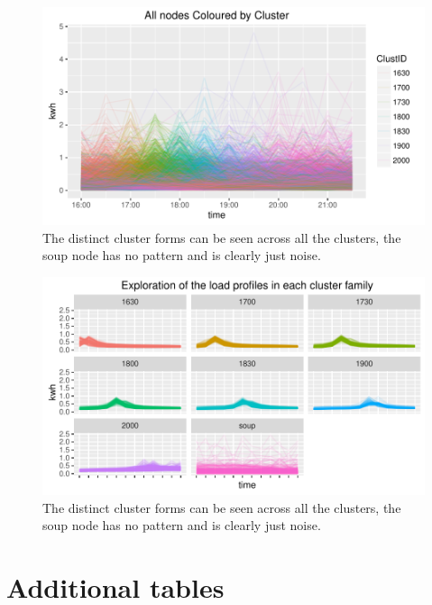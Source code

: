 \begin{figure}
    \centering
    \includegraphics[width = \textwidth]{Figures/Appendix/AllNodesClustercolour}
    \caption[All Nodes for one day]{The distinct cluster forms can be seen across all the clusters, the soup node has no pattern and is clearly just noise.}
    \label{fig:AllNodesClustercolour}
\end{figure}


\begin{figure}
    \centering
    \includegraphics[width = \textwidth]{Figures/Appendix/AllCLustFamilies}
    \caption[All Clusters grouped by family]{The distinct cluster forms can be seen across all the clusters, the soup node has no pattern and is clearly just noise.}
    \label{fig:AllCLustFamilies}
\end{figure}

\FloatBarrier

\section{Additional tables}



